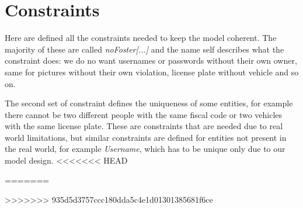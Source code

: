 \section{Constraints}
Here are defined all the constraints needed to keep the model coherent. The
majority of these are called \emph{noFoster[...]} and the name self describes
what the constraint does: we do no want usernames or passwords without their own
owner, same for pictures without their own violation, license plate without vehicle
and so on.

The second set of constraint defines the uniqueness of some entities, for
example there cannot be two different people with the same fiscal code or two
vehicles with the same license plate. These are constraints that are needed due
to real world limitations, but similar constraints are defined for entities not
present in the real world, for example \emph{Username}, which has to be unique
only due to our model design.
<<<<<<< HEAD


=======

>>>>>>> 935d5d3757ccc180dda5c4e1d01301385681f6ce
